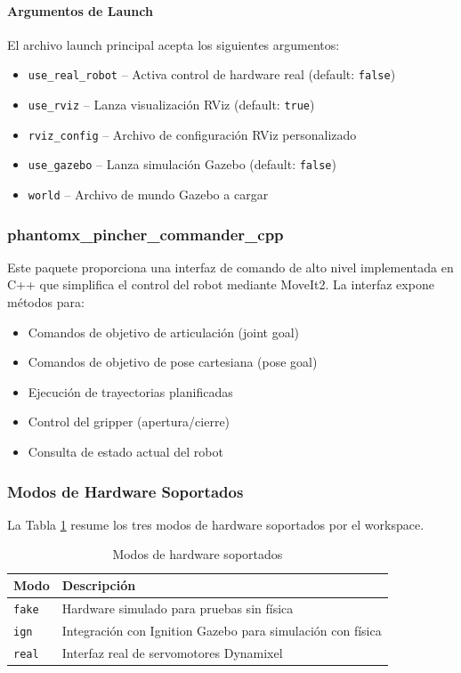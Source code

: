 \paragraph{Argumentos de Launch}

El archivo launch principal acepta los siguientes argumentos:

\begin{itemize}
    \item \texttt{use\_real\_robot} -- Activa control de hardware real (default: \texttt{false})
    \item \texttt{use\_rviz} -- Lanza visualización RViz (default: \texttt{true})
    \item \texttt{rviz\_config} -- Archivo de configuración RViz personalizado
    \item \texttt{use\_gazebo} -- Lanza simulación Gazebo (default: \texttt{false})
    \item \texttt{world} -- Archivo de mundo Gazebo a cargar
\end{itemize}

\subsubsection{phantomx\_pincher\_commander\_cpp}

Este paquete proporciona una interfaz de comando de alto nivel implementada en C++ que simplifica el control del robot mediante MoveIt2. La interfaz expone métodos para:

\begin{itemize}
    \item Comandos de objetivo de articulación (joint goal)
    \item Comandos de objetivo de pose cartesiana (pose goal)
    \item Ejecución de trayectorias planificadas
    \item Control del gripper (apertura/cierre)
    \item Consulta de estado actual del robot
\end{itemize}

\subsubsection{Modos de Hardware Soportados}

La Tabla \ref{tab:modos_hardware} resume los tres modos de hardware soportados por el workspace.

\begin{table}[H]
\centering
\caption{Modos de hardware soportados}
\label{tab:modos_hardware}
\small
\begin{tabular}{|l|p{11cm}|}
\hline
\textbf{Modo} & \textbf{Descripción} \\
\hline
\texttt{fake} & Hardware simulado para pruebas sin física \\
\texttt{ign} & Integración con Ignition Gazebo para simulación con física \\
\texttt{real} & Interfaz real de servomotores Dynamixel \\
\hline
\end{tabular}
\end{table}


